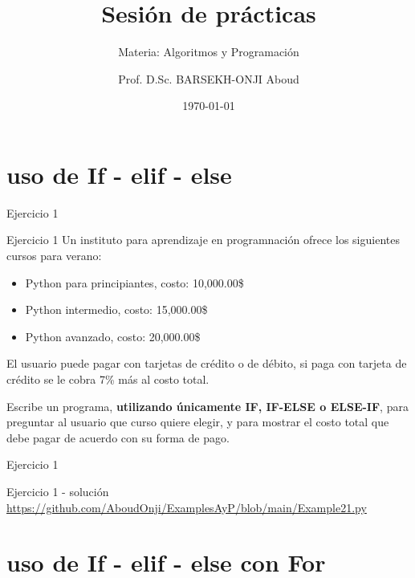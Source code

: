 \documentclass[aspectratio=169,xcolor=dvipsnames]{beamer}
\title{Sesión de prácticas}
\subtitle{Materia: Algoritmos y Programación}
\author{Prof. D.Sc. BARSEKH-ONJI Aboud}
\institute
{
    Facultad de Ingeniería \\
    Universidad Anáhuac México
}
\date{\today}
\begin{document}
\begin{frame}
    \titlepage
\end{frame}

\section{uso de If - elif - else}

\begin{frame}{Ejercicio 1}
\begin{block}{Ejercicio 1}
Un instituto para aprendizaje en programnación ofrece los siguientes cursos para verano:
\begin{itemize}
    \item Python para principiantes, costo: 10,000.00\$
    \item Python intermedio, costo: 15,000.00\$
    \item Python avanzado, costo: 20,000.00\$
\end{itemize}

El usuario puede pagar con tarjetas de crédito o de débito, si paga con tarjeta de crédito se le cobra 7\% más al costo total.

Escribe un programa, \textbf{utilizando únicamente IF, IF-ELSE o ELSE-IF}, para preguntar al usuario que curso quiere elegir, y para mostrar el costo total que debe pagar de acuerdo con su forma de pago.

\end{block}
    
\end{frame}

\begin{frame}{Ejercicio 1}
\begin{block}{Ejercicio 1 - solución}
\url{https://github.com/AboudOnji/ExamplesAyP/blob/main/Example21.py}

\end{block}
    
\end{frame}

\section{uso de If - elif - else con For}
\end{document}
